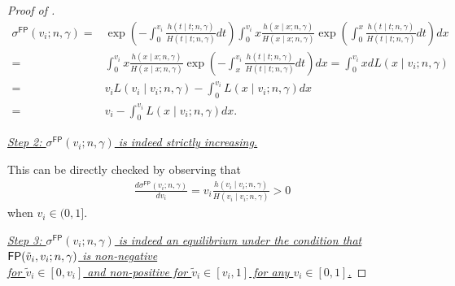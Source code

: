 \begin{proof}[Proof of ]
\begin{align*}
\sigma^{\mathsf{FP}}(v_i;n,\gamma) =&  \exp\left(-\int_{0}^{v_i} \frac{h(t\mid t;n,\gamma)}{H(t\mid t;n,\gamma)}dt\right) \int_{0}^{v_i}x \frac{h(x\mid x;n,\gamma)}{H(x\mid x;n,\gamma)}\exp\left(\int_{0}^{x} \frac{h(t\mid t;n,\gamma)}{H(t\mid t;n,\gamma)}dt\right) dx \\
=& \int_{0}^{v_i}x \frac{h(x\mid x;n,\gamma)}{H(x\mid x;n,\gamma)} \exp\left(-\int_{x}^{v_i} \frac{h(t\mid t;n,\gamma)}{H(t\mid t;n,\gamma)}dt\right) dx
= \int_{0}^{v_i}x  dL(x\mid v_i;n,\gamma) \\
=& v_i L(v_i\mid v_i;n,\gamma) - \int_{0}^{v_i}L(x\mid v_i;n,\gamma) dx\\
=& v_i - \int_{0}^{v_i}L(x\mid v_i;n,\gamma) dx.
\end{align*}

 \medskip

\noindent\textit{\underline{Step 2: $\sigma^{\mathsf{FP}}(v_i;n,\gamma)$ is indeed strictly increasing.}}

 \medskip

\noindent This can be directly checked by observing that 
\begin{align*}
    \frac{d \sigma^{\mathsf{FP}}({v}_i;n,\gamma)}{d{v}_i} = v_i \frac{h(v_i\mid v_i;n,\gamma)}{H(v_i\mid v_i;n,\gamma)} >0 
\end{align*}
when $v_i\in (0,1]$.

 \medskip

\noindent\textit{\underline{Step 3: $\sigma^{\mathsf{FP}}(v_i;n,\gamma)$ is indeed an equilibrium under the condition that $\mathsf{FP}(\tilde{v}_i,v_i;n,\gamma)$ is non-negative}}
\\
\noindent\textit{\underline{for $\tilde{v}_i\in [0,v_i]$ and non-positive for $\tilde{v}_i\in [v_i,1]$ for any $v_i\in [0,1]$.}}

\medskip


\end{proof}
